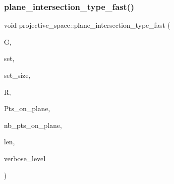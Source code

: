 \subsubsection{\texorpdfstring{plane\+\_\+intersection\+\_\+type\+\_\+fast()}{plane\_intersection\_type\_fast()}}
{\footnotesize\ttfamily void projective\+\_\+space\+::plane\+\_\+intersection\+\_\+type\+\_\+fast (\begin{DoxyParamCaption}\item[{\mbox{\hyperlink{classgrassmann}{grassmann}} $\ast$}]{G,  }\item[{\mbox{\hyperlink{galois_8h_a09fddde158a3a20bd2dcadb609de11dc}{I\+NT}} $\ast$}]{set,  }\item[{\mbox{\hyperlink{galois_8h_a09fddde158a3a20bd2dcadb609de11dc}{I\+NT}}}]{set\+\_\+size,  }\item[{\mbox{\hyperlink{classlonginteger__object}{longinteger\+\_\+object}} $\ast$\&}]{R,  }\item[{\mbox{\hyperlink{galois_8h_a09fddde158a3a20bd2dcadb609de11dc}{I\+NT}} $\ast$$\ast$\&}]{Pts\+\_\+on\+\_\+plane,  }\item[{\mbox{\hyperlink{galois_8h_a09fddde158a3a20bd2dcadb609de11dc}{I\+NT}} $\ast$\&}]{nb\+\_\+pts\+\_\+on\+\_\+plane,  }\item[{\mbox{\hyperlink{galois_8h_a09fddde158a3a20bd2dcadb609de11dc}{I\+NT}} \&}]{len,  }\item[{\mbox{\hyperlink{galois_8h_a09fddde158a3a20bd2dcadb609de11dc}{I\+NT}}}]{verbose\+\_\+level }\end{DoxyParamCaption})}

\mbox{\label{classprojective__space_aaa6ad6d1120268b5abd1ac2c01150b76}} 
